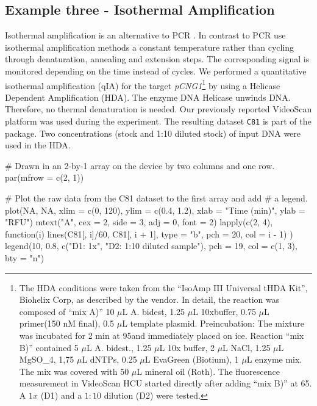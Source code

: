 \subsection{Example three - Isothermal Amplification}

Isothermal amplification is an alternative to PCR \citep{rodiger_nucleic_2014}. 
In contrast to PCR use isothermal amplification methods a constant temperature 
rather than cycling through denaturation, annealing and extension steps. The 
corresponding signal is monitored depending on the time instead of cycles. We 
performed a quantitative isothermal amplification (qIA) for the target 
\textit{pCNG1}\footnote{The HDA conditions were taken from the ``IsoAmp III 
Universal tHDA Kit'', Biohelix Corp, as described by the vendor. In detail, the 
reaction was composed of ``mix A)'' 10 $\mu$L A. bidest, 1.25 $\mu$L 10xbuffer, 
0.75 $\mu$L primer(150 nM final), 0.5 $\mu$L template plasmid. Preincubation: 
The mixture was incubated for 2 min at 95\textcelsius and immediately placed on 
ice. Reaction ``mix B)'' contained 5 $\mu$L A. bidest., 1.25 $\mu$L 10x buffer, 
2 $\mu$L NaCl, 1.25 $\mu$L MgSO_{4}, 1,75 $\mu$L dNTPs, 0.25 $\mu$L EvaGreen 
(Biotium), 1 $\mu$L enzyme mix. The mix was covered with 50 $\mu$L mineral oil 
(Roth). The fluorescence measurement in VideoScan HCU started directly after 
adding ``mix B)'' at 65\textcelsius. A $1x$ (D1) and a $1:10$ dilution (D2) were 
tested.} by using a Helicase Dependent Amplification (HDA). The enzyme DNA 
Helicase unwinds DNA. Therefore, no thermal denaturation is needed. Our 
previously reported VideoScan platform \citep{rodiger_highly_2013} was used 
during the experiment. The resulting dataset \texttt{C81} is part of the 
 package. Two concentrations (stock and 1:10 diluted stock) of 
input DNA were used in the HDA.

\begin{example}
# Drawn in an 2-by-1 array on the device by two columns and one row.
par(mfrow = c(2, 1))

# Plot the raw data from the C81 dataset to the first array and add
# a legend.
plot(NA, NA, xlim = c(0, 120), ylim = c(0.4, 1.2), xlab = "Time (min)", ylab = "RFU")
mtext("A", cex = 2, side = 3, adj = 0, font = 2)
lapply(c(2, 4), function(i) {
    lines(C81[, i]/60, C81[, i + 1], type = "b", pch = 20, col = i - 1)
})
legend(10, 0.8, c("D1: 1x", "D2: 1:10 diluted sample"), pch = 19, col = c(1, 3), 
    bty = "n")
\end{example}

